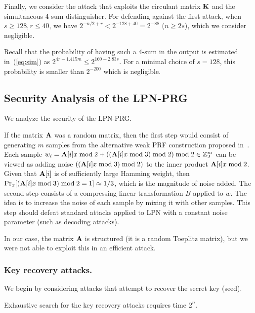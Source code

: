 Finally, we consider the attack that exploits the circulant matrix $\mat{K}$
and the simultaneous 4-sum distinguisher.
For defending against the first attack,
when $s \geq 128, r \leq 40$, we have $2^{-n/2 + r} < 2^{-128 + 40} = 2^{-88}$ ($n \geq 2s$),
which we consider negligible.

Recall that the probability of having such a 4-sum in the output is estimated
in~(\ref{eq:sim}) as $2^{4r - 1.415 m} \leq 2^{160 - 2.83s}$.
For a minimal choice of $s = 128$, this probability is smaller than $2^{-200}$
which is negligible.



\subsection{Security Analysis of the LPN-PRG}

We analyze the security of the LPN-PRG.

If the matrix $\mat{A}$ was a random matrix, then
the first step would consist of generating $m$ samples from the alternative weak PRF construction proposed
in~\cite{boneh2018-darkmatter}. Each sample
$w_i = \mat{A}[i] x \bmod 2 + ((\mat{A}[i] x \bmod 3) \bmod 2) \bmod 2 \in \Z_2^m$
can be viewed as adding noise $((\mat{A}[i] x \bmod 3) \bmod 2)$ to the inner product $\mat{A}[i] x \bmod 2$.
Given that $\mat{A}[i]$ is of sufficiently large Hamming weight, then
$\Pr_x[(\mat{A}[i] x \bmod 3) \bmod 2 = 1] \approx 1/3$, which is the magnitude of noise added.
The second step consists of a compressing linear transformation $B$ applied to $w$.
The idea is to increase the noise of each sample by mixing it with other samples.
This step should defeat standard attacks applied to LPN with a constant noise parameter
(such as decoding attacks).

In our case, the matrix $\mat{A}$ is structured (it is a random Toeplitz matrix),
but we were not able to exploit this in an efficient attack.



\subsubsection{Key recovery attacks.}
We begin by considering attacks that attempt to recover the secret key (seed).

Exhaustive search for the key recovery attacks requires time $2^n$.

